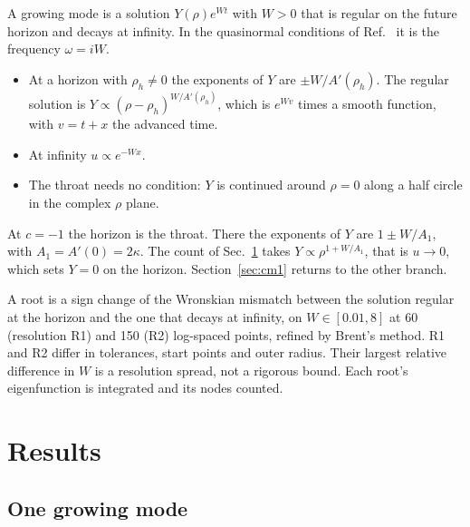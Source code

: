 \documentclass[11pt]{article}
\theoremstyle{plain}
\begin{document}
A growing mode is a solution $Y(\rho)e^{Wt}$ with $W>0$ that is regular on the future horizon and decays at infinity. In
the quasinormal conditions of Ref.~\cite{BKZ12} it is the frequency $\omega=iW$.
\begin{itemize}
\item At a horizon with $\rho_h\ne0$ the exponents of $Y$ are $\pm W/A'(\rho_h)$. The regular solution is
  $Y\propto(\rho-\rho_h)^{W/A'(\rho_h)}$, which is $e^{Wv}$ times a smooth function, with $v=t+x$ the advanced time.
\item At infinity $u\propto e^{-Wx}$.
\item The throat needs no condition: $Y$ is continued around $\rho=0$ along a half circle in the complex $\rho$ plane.
\end{itemize}
At $c=-1$ the horizon is the throat. There the exponents of $Y$ are $1\pm W/A_1$, with $A_1=A'(0)=2\kappa$. The count of
Sec.~\ref{sec:results} takes $Y\propto\rho^{1+W/A_1}$, that is $u\to0$, which sets $Y=0$ on the horizon.
Section~\ref{sec:cm1} returns to the other branch.

A root is a sign change of the Wronskian mismatch between the solution regular at the horizon and the one that decays at
infinity, on $W\in[0.01, 8]$ at 60 (resolution R1) and 150 (R2) log-spaced points, refined by Brent's method. R1 and R2
differ in tolerances, start points and outer radius. Their largest relative difference in $W$ is a resolution spread, not a
rigorous bound. Each root's eigenfunction is integrated and its nodes counted.

\section{Results}\label{sec:results}

\subsection{One growing mode}
\end{document}
